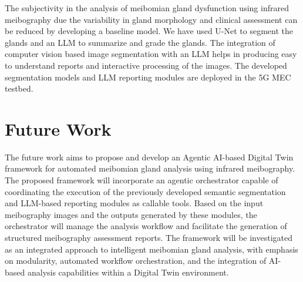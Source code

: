 \documentclass{article}
\begin{document}
The subjectivity in the analysis of meibomian gland dysfunction using infrared meibography due the variability in gland morphology and clinical assessment can be reduced by developing a baseline model. We have used U-Net to segment the glands and an LLM to summarize and grade the glands. The integration of computer vision based image segmentation with an LLM helps in producing easy to understand reports and interactive processing of the images. The developed segmentation models and LLM reporting modules are deployed in the 5G MEC testbed.

\section{Future Work}


The future work aims to propose and develop an Agentic AI-based Digital Twin framework for automated meibomian gland analysis using infrared meibography. The proposed framework will incorporate an agentic orchestrator capable of coordinating the execution of the previously developed semantic segmentation and LLM-based reporting modules as callable tools. Based on the input meibography images and the outputs generated by these modules, the orchestrator will manage the analysis workflow and facilitate the generation of structured meibography assessment reports. The framework will be investigated as an integrated approach to intelligent meibomian gland analysis, with emphasis on modularity, automated workflow orchestration, and the integration of AI-based analysis capabilities within a Digital Twin environment.



\end{document}
